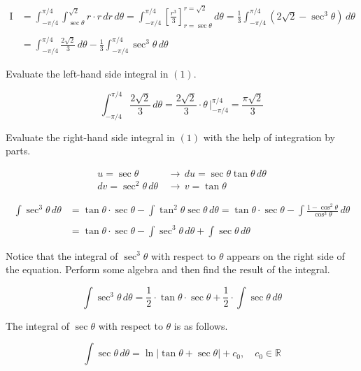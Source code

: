 \documentclass{article}
\begin{document}
\begin{align}\mathrm{I}&=\int_{-\pi/4}^{\pi/4}\int_{\sec\theta}^{\sqrt2}r\cdot r\,dr\,d\theta=\int_{-\pi/4}^{\pi/4}\left[\frac{r^3}3\right]_{r=\sec\theta}^{r=\sqrt2}\,d\theta=\frac13\int_{-\pi/4}^{\pi/4}\left(2\sqrt2-\sec^3\theta\right) \,d\theta\nonumber\\\nonumber\\&=\int_{-\pi/4}^{\pi/4}\frac{2\sqrt2}3\,d\theta-\frac13\int_{-\pi/4}^{\pi/4}\sec^3\theta\,d\theta\end{align}

\hfill

\noindent Evaluate the left-hand side integral in $(1)$.

\[\int_{-\pi/4}^{\pi/4}\frac{2\sqrt2}3\,d\theta=\frac{2\sqrt2}3\cdot\theta\,\bigg|_{-\pi/4}^{\pi/4}=\frac{\pi\sqrt2}3\]

\hfill

\noindent Evaluate the right-hand side integral in $(1)$ with the help of integration by parts.

\begin{align*}u=\sec\theta\,&\rightarrow\,du=\sec\theta\tan\theta\,d\theta\\dv=\sec^2\theta\,d\theta\,&\rightarrow\,v=\tan\theta\end{align*}

\begin{align*}
\int\sec^3\theta\,d\theta&=\tan\theta\cdot\sec\theta-\int\tan^2\theta\sec\theta\,d\theta=\tan\theta\cdot\sec\theta-\int\frac{1-\cos^2\theta}{\cos^3\theta}\,d\theta\\\\&=\tan\theta\cdot\sec\theta-\int\sec^3\theta\,d\theta+\int\sec\theta\,d\theta
\end{align*}

\hfill

\noindent Notice that the integral of $\sec^3\theta$ with respect to $\theta$ appears on the right side of the equation. Perform some algebra and then find the result of the integral.

\begin{equation*}\int\sec^3\theta\,d\theta=\frac12\cdot\tan\theta\cdot\sec\theta+\frac12\cdot\int\sec\theta\,d\theta\end{equation*}

\hfill

\noindent The integral of $\sec\theta$ with respect to $\theta$ is as follows.

\begin{equation*}\int\sec\theta\,d\theta=\ln\left|\tan\theta+\sec\theta\right|+c_0,\quad c_0\in\mathbb{R}\end{equation*}
\end{document}
